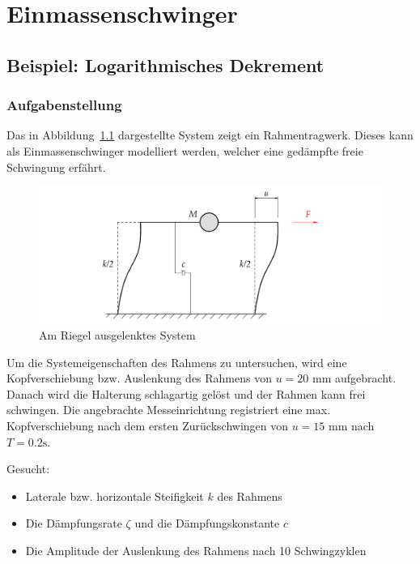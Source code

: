 \documentclass[
  letterpaper,
  DIV=11]{scrreprt}
\providecommand{\tightlist}{%
  \setlength{\itemsep}{0pt}\setlength{\parskip}{0pt}}\usepackage{longtable,booktabs,array}
\begin{document}
\part{Einmassenschwinger}

\hypertarget{beispiel-logarithmisches-dekrement}{%
\chapter{Beispiel: Logarithmisches
Dekrement}\label{beispiel-logarithmisches-dekrement}}

\hypertarget{aufgabenstellung-3}{%
\section{Aufgabenstellung}\label{aufgabenstellung-3}}

Das in Abbildung~\ref{fig-ems_log_dek_system} dargestellte System zeigt
ein Rahmentragwerk. Dieses kann als Einmassenschwinger modelliert
werden, welcher eine gedämpfte freie Schwingung erfährt.

\begin{figure}[H]

{\centering \includegraphics{index_files/mediabag/bilder/aufgabe_ems_log_dek.pdf}

}

\caption{\label{fig-ems_log_dek_system}Am Riegel ausgelenktes System}

\end{figure}

Um die Systemeigenschaften des Rahmens zu untersuchen, wird eine
Kopfverschiebung bzw. Auslenkung des Rahmens von \(u = 20\text{ mm}\)
aufgebracht. Danach wird die Halterung schlagartig gelöst und der Rahmen
kann frei schwingen. Die angebrachte Messeinrichtung registriert eine
max. Kopfverschiebung nach dem ersten Zurückschwingen von
\(u = 15\text{ mm}\) nach \(T = 0.2 \text{s}\).

Gesucht:

\begin{itemize}
\tightlist
\item
  Laterale bzw. horizontale Steifigkeit \(k\) des Rahmens
\item
  Die Dämpfungsrate \(\zeta\) und die Dämpfungskonstante \(c\)
\item
  Die Amplitude der Auslenkung des Rahmens nach 10 Schwingzyklen
\end{itemize}
\end{document}

